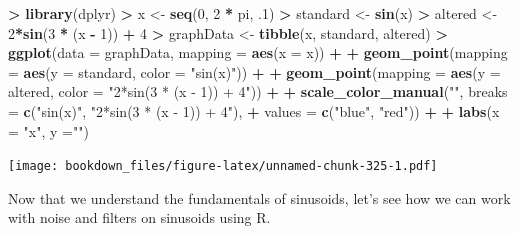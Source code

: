 \documentclass[
]{krantz}
\makeatletter
\newenvironment{Shaded}{\begin{snugshade}}{\end{snugshade}}
\newcommand{\DataTypeTok}[1]{\textcolor[rgb]{0.27,0.27,0.27}{#1}}
\newcommand{\DecValTok}[1]{\textcolor[rgb]{0.06,0.06,0.06}{#1}}
\newcommand{\FloatTok}[1]{\textcolor[rgb]{0.06,0.06,0.06}{#1}}
\newcommand{\KeywordTok}[1]{\textcolor[rgb]{0.27,0.27,0.27}{\textbf{#1}}}
\newcommand{\NormalTok}[1]{#1}
\newcommand{\OperatorTok}[1]{\textcolor[rgb]{0.43,0.43,0.43}{\textbf{#1}}}
\newcommand{\StringTok}[1]{\textcolor[rgb]{0.5,0.5,0.5}{#1}}
\newenvironment{kframe}{%
\medskip{}
\setlength{\fboxsep}{.8em}
 \def\at@end@of@kframe{}%
 \ifinner\ifhmode%
  \def\at@end@of@kframe{\end{minipage}}%
  \begin{minipage}{\columnwidth}%
 \fi\fi%
 \def\FrameCommand##1{\hskip\@totalleftmargin \hskip-\fboxsep
 \colorbox{shadecolor}{##1}\hskip-\fboxsep
     \hskip-\linewidth \hskip-\@totalleftmargin \hskip\columnwidth}%
 \MakeFramed {\advance\hsize-\width
   \@totalleftmargin\z@ \linewidth\hsize
   \@setminipage}}%
 {\par\unskip\endMakeFramed%
 \at@end@of@kframe}
\renewenvironment{Shaded}{\begin{kframe}}{\end{kframe}}
\makeatother
\begin{document}
\begin{Shaded}
\begin{Highlighting}[]
\OperatorTok{\textgreater{}}\StringTok{ }\KeywordTok{library}\NormalTok{(dplyr)}
\OperatorTok{\textgreater{}}\StringTok{ }\NormalTok{x \textless{}{-}}\StringTok{ }\KeywordTok{seq}\NormalTok{(}\DecValTok{0}\NormalTok{, }\DecValTok{2} \OperatorTok{*}\StringTok{ }\NormalTok{pi, }\FloatTok{.1}\NormalTok{)}
\OperatorTok{\textgreater{}}\StringTok{ }\NormalTok{standard \textless{}{-}}\StringTok{ }\KeywordTok{sin}\NormalTok{(x)}
\OperatorTok{\textgreater{}}\StringTok{ }\NormalTok{altered \textless{}{-}}\StringTok{ }\DecValTok{2}\OperatorTok{*}\KeywordTok{sin}\NormalTok{(}\DecValTok{3} \OperatorTok{*}\StringTok{ }\NormalTok{(x }\OperatorTok{{-}}\StringTok{ }\DecValTok{1}\NormalTok{)) }\OperatorTok{+}\StringTok{ }\DecValTok{4}
\OperatorTok{\textgreater{}}\StringTok{ }\NormalTok{graphData \textless{}{-}}\StringTok{ }\KeywordTok{tibble}\NormalTok{(x, standard, altered)}
\OperatorTok{\textgreater{}}\StringTok{ }\KeywordTok{ggplot}\NormalTok{(}\DataTypeTok{data =}\NormalTok{ graphData, }\DataTypeTok{mapping =} \KeywordTok{aes}\NormalTok{(}\DataTypeTok{x =}\NormalTok{ x)) }\OperatorTok{+}\StringTok{ }
\OperatorTok{+}\StringTok{   }\KeywordTok{geom\_point}\NormalTok{(}\DataTypeTok{mapping =} \KeywordTok{aes}\NormalTok{(}\DataTypeTok{y =}\NormalTok{ standard, }\DataTypeTok{color =} \StringTok{"sin(x)"}\NormalTok{)) }\OperatorTok{+}\StringTok{ }
\OperatorTok{+}\StringTok{   }\KeywordTok{geom\_point}\NormalTok{(}\DataTypeTok{mapping =} \KeywordTok{aes}\NormalTok{(}\DataTypeTok{y =}\NormalTok{ altered, }\DataTypeTok{color =} \StringTok{"2*sin(3 * (x {-} 1)) + 4"}\NormalTok{)) }\OperatorTok{+}\StringTok{ }
\OperatorTok{+}\StringTok{   }\KeywordTok{scale\_color\_manual}\NormalTok{(}\StringTok{""}\NormalTok{, }\DataTypeTok{breaks =} \KeywordTok{c}\NormalTok{(}\StringTok{"sin(x)"}\NormalTok{, }\StringTok{"2*sin(3 * (x {-} 1)) + 4"}\NormalTok{), }
\OperatorTok{+}\StringTok{                      }\DataTypeTok{values =} \KeywordTok{c}\NormalTok{(}\StringTok{"blue"}\NormalTok{, }\StringTok{"red"}\NormalTok{)) }\OperatorTok{+}\StringTok{ }
\OperatorTok{+}\StringTok{   }\KeywordTok{labs}\NormalTok{(}\DataTypeTok{x =} \StringTok{"x"}\NormalTok{, }\DataTypeTok{y =}\StringTok{""}\NormalTok{)}
\end{Highlighting}
\end{Shaded}

\texttt{[image: bookdown\_files/figure-latex/unnamed-chunk-325-1.pdf]}

Now that we understand the fundamentals of sinusoids, let's see how we can work with noise and filters on sinusoids using R.
\end{document}
